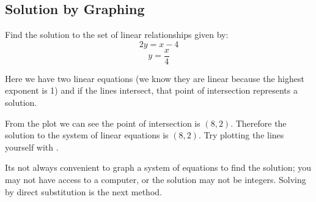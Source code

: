  \subsection*{Solution by Graphing}
 \example Find the solution to the set of linear relationships given by:
 $$2y=x-4$$
 $$y=\frac{x}{4}$$
  \begin{multicols}{2}
 \solution Here we have two linear equations (we know they are linear because the highest exponent is 1) and if the lines intersect, that point of intersection represents a solution.

 	From the plot we can see the point of intersection is $(8,2)$. Therefore the solution to the system of linear equations is $(8,2)$. Try plotting the lines yourself with \desmos.


 	Its not always convenient to graph a system of equations to find the solution; you may not have access to a computer, or the solution may not be integers. Solving by direct substitution is the next method.
 	\columnbreak
 \begin{center}
\end{center}
\end{multicols}

